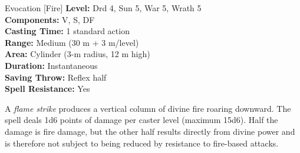 {Evocation [Fire]}
{
	\textbf{Level:}
	Drd 4, Sun 5, War 5, Wrath 5\\
	\textbf{Components:}
	V, S, DF\\
	\textbf{Casting Time:}
	1 standard action\\
	\textbf{Range:}
	Medium (30 m + 3 m/level)\\
	\textbf{Area:}
	Cylinder (3-m radius, 12 m high)\\
	\textbf{Duration:}
	Instantaneous\\
	\textbf{Saving Throw:}
	Reflex half\\
	\textbf{Spell Resistance:}
	Yes\\
}
{
	A \emph{flame strike} produces a vertical column of divine fire roaring downward. The spell deals 1d6 points of damage per caster level (maximum 15d6). Half the damage is fire damage, but the other half results directly from divine power and is therefore not subject to being reduced by resistance to fire-based attacks.

}
